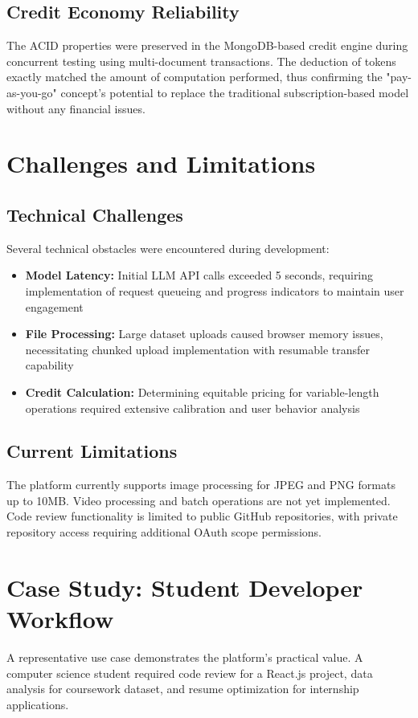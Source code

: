 \documentclass[conference]{IEEEtran}
\begin{document}
\subsection{Credit Economy Reliability}
The ACID properties were preserved in the MongoDB-based credit engine during concurrent testing using multi-document transactions. The deduction of tokens exactly matched the amount of computation performed, thus confirming the "pay-as-you-go" concept's potential to replace the traditional subscription-based model without any financial issues.

\section{Challenges and Limitations}
\subsection{Technical Challenges}
Several technical obstacles were encountered during development:
\begin{itemize}
    \item \textbf{Model Latency:} Initial LLM API calls exceeded 5 seconds, requiring implementation of request queueing and progress indicators to maintain user engagement
    \item \textbf{File Processing:} Large dataset uploads caused browser memory issues, necessitating chunked upload implementation with resumable transfer capability
    \item \textbf{Credit Calculation:} Determining equitable pricing for variable-length operations required extensive calibration and user behavior analysis
\end{itemize}

\subsection{Current Limitations}
The platform currently supports image processing for JPEG and PNG formats up to 10MB. Video processing and batch operations are not yet implemented. Code review functionality is limited to public GitHub repositories, with private repository access requiring additional OAuth scope permissions.

\section{Case Study: Student Developer Workflow}
A representative use case demonstrates the platform's practical value. A computer science student required code review for a React.js project, data analysis for coursework dataset, and resume optimization for internship applications.
\end{document}
